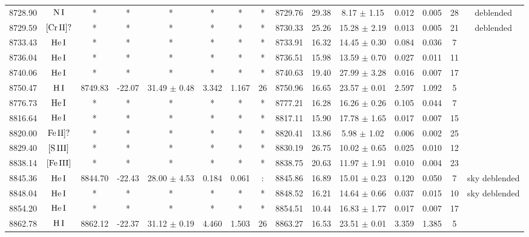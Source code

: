 \documentclass{article}
\begin{document}
\begin{table*}
\begin{adjustbox}{width=\textwidth}
\begin{tabular}{ccccccccccccccc}
8728.90 & $\mbox{N}\thinspace \mbox{I}$ & * & * & * & * & * & * & 8729.76 & 29.38 & 8.17 $\pm$ 1.15 & 0.012 & 0.005 & 28 &  deblended \\
8729.59 & $\mbox{[Cr}\thinspace \mbox{II]?}$ & * & * & * & * & * & * & 8730.33 & 25.26 & 15.28 $\pm$ 2.19 & 0.013 & 0.005 & 21 &  deblended \\
8733.43 & $\mbox{He}\thinspace \mbox{I}$ & * & * & * & * & * & * & 8733.91 & 16.32 & 14.45 $\pm$ 0.30 & 0.084 & 0.036 & 7 &  \\
8736.04 & $\mbox{He}\thinspace \mbox{I}$ & * & * & * & * & * & * & 8736.51 & 15.98 & 13.59 $\pm$ 0.70 & 0.027 & 0.011 & 11 &  \\
8740.06 & $\mbox{He}\thinspace \mbox{I}$ & * & * & * & * & * & * & 8740.63 & 19.40 & 27.99 $\pm$ 3.28 & 0.016 & 0.007 & 17 &  \\
8750.47 & $\mbox{H}\thinspace \mbox{I}$ & 8749.83 & -22.07 & 31.49 $\pm$ 0.48 & 3.342 & 1.167 & 26 & 8750.96 & 16.65 & 23.57 $\pm$ 0.01 & 2.597 & 1.092 & 5 &  \\
8776.73 & $\mbox{He}\thinspace \mbox{I}$ & * & * & * & * & * & * & 8777.21 & 16.28 & 16.26 $\pm$ 0.26 & 0.105 & 0.044 & 7 &  \\
8816.64 & $\mbox{He}\thinspace \mbox{I}$ & * & * & * & * & * & * & 8817.11 & 15.90 & 17.78 $\pm$ 1.65 & 0.017 & 0.007 & 15 &  \\
8820.00 & $\mbox{Fe}\thinspace \mbox{II]?}$ & * & * & * & * & * & * & 8820.41 & 13.86 & 5.98 $\pm$ 1.02 & 0.006 & 0.002 & 25 &  \\
8829.40 & $\mbox{[S}\thinspace \mbox{III]}$ & * & * & * & * & * & * & 8830.19 & 26.75 & 10.02 $\pm$ 0.65 & 0.025 & 0.010 & 12 &  \\
8838.14 & $\mbox{[Fe}\thinspace \mbox{III]}$ & * & * & * & * & * & * & 8838.75 & 20.63 & 11.97 $\pm$ 1.91 & 0.010 & 0.004 & 23 &  \\
8845.36 & $\mbox{He}\thinspace \mbox{I}$ & 8844.70 & -22.43 & 28.00 $\pm$ 4.53 & 0.184 & 0.061 & : & 8845.86 & 16.89 & 15.01 $\pm$ 0.23 & 0.120 & 0.050 & 7 &  sky deblended \\
8848.04 & $\mbox{He}\thinspace \mbox{I}$ & * & * & * & * & * & * & 8848.52 & 16.21 & 14.64 $\pm$ 0.66 & 0.037 & 0.015 & 10 &  sky deblended \\
8854.20 & $\mbox{He}\thinspace \mbox{I}$ & * & * & * & * & * & * & 8854.51 & 10.44 & 16.83 $\pm$ 1.77 & 0.017 & 0.007 & 17 &  \\
8862.78 & $\mbox{H}\thinspace \mbox{I}$ & 8862.12 & -22.37 & 31.12 $\pm$ 0.19 & 4.460 & 1.503 & 26 & 8863.27 & 16.53 & 23.51 $\pm$ 0.01 & 3.359 & 1.385 & 5 &  \\

\end{tabular}
\end{adjustbox}
\end{table*}
\end{document}
